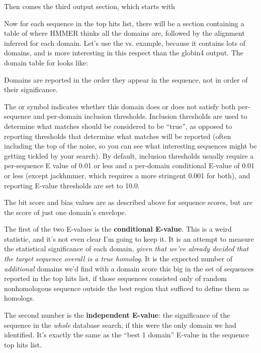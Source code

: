 Then comes the third output section, which starts with


Now for each sequence in the top hits list, there will be a section 
containing a table of where HMMER thinks all the domains are,
followed by the alignment inferred for each domain. Let's use the
 vs.  example, because it contains lots
of domains, and is more interesting in this respect than the globin4
output.  The domain table for  looks like:


Domains are reported in the order they appear in the sequence, not in
order of their significance.

The \mono{!} or  symbol indicates whether this domain does
or does not satisfy both per-sequence and per-domain inclusion
thresholds. Inclusion thresholds are used to determine what matches
should be considered to be ``true'', as opposed to reporting
thresholds that determine what matches will be reported (often
including the top of the noise, so you can see what interesting
sequences might be getting tickled by your search). By default,
inclusion thresholds usually require a per-sequence E value of 0.01 or
less and a per-domain conditional E-value of 0.01 or less (except
jackhmmer, which requires a more stringent 0.001 for both), and
reporting E-value thresholds are set to 10.0.

The bit score and bias values are as described above for sequence
scores, but are the score of just one domain's envelope. 

The first of the two E-values is the \textbf{conditional
  E-value}. This is a weird statistic, and it's not even clear I'm
going to keep it. It is an attempt to
measure the statistical significance of each domain, \emph{given that
  we've already decided that the target sequence overall is a true
  homolog}.  It is the expected number of \emph{additional} domains
we'd find with a domain score this big in the set of sequences
reported in the top hits list, if those sequences consisted only of
random nonhomologous sequence outside the best region that sufficed to
define them as homologs.

The second number is the \textbf{independent E-value}: the
significance of the sequence in the \emph{whole} database search, if
this were the only domain we had identified. It's exactly the same as
the ``best 1 domain'' E-value in the sequence top hits list.

